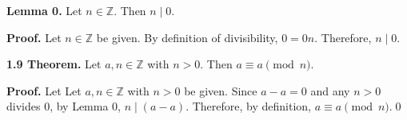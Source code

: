 \documentclass[12pt]{article}
\begin{document}
\noindent\textbf{Lemma 0.} Let $n\in\mathbb{Z}$. Then $n\mid 0$.

\bigskip

\noindent\textbf{Proof.} Let $n\in\mathbb{Z}$ be given. By definition of divisibility, $0=0n$. Therefore, $n\mid 0$.

\bigskip

\noindent\textbf{1.9 Theorem.} Let $a,n\in\mathbb{Z}$ with $n>0$. Then $a\equiv a\pmod{n}$.

\bigskip

\noindent\textbf{Proof.} Let Let $a,n\in\mathbb{Z}$ with $n>0$ be given. Since $a-a=0$ and any $n>0$ divides 0, by Lemma 0, $n\mid(a-a)$. Therefore, by definition, $a\equiv a\pmod{n}$.\qed
\end{document}

